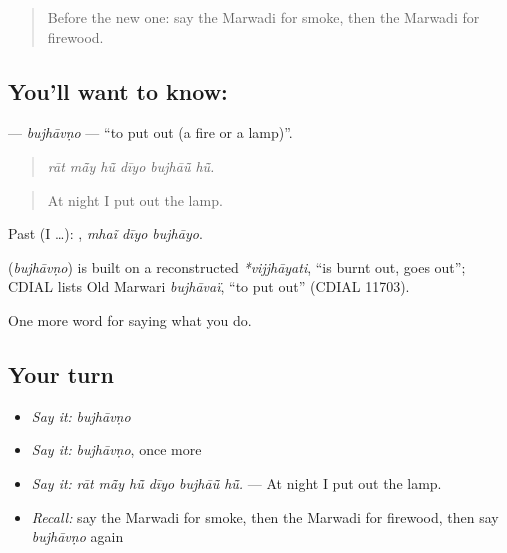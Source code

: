 \begin{quote}
Before the new one: say the Marwadi for smoke, then the Marwadi for firewood.
\end{quote}

\subsection*{You'll want to know: }
\textbf{} — \emph{bujhāvṇo} — \textquotedblleft{}to put out (a fire or a lamp)\textquotedblright{}.

\begin{quote}
     
\end{quote}

\begin{quote}
\emph{rāt mā̃y hū̃ dīyo bujhāū̃ hū̃.}
\end{quote}

\begin{quote}
At night I put out the lamp.
\end{quote}

Past (I …):   , \emph{mhaĩ dīyo bujhāyo}.

\begin{cousinweb}
\textbf{} (\emph{bujhāvṇo}) is built on a reconstructed \emph{*vijjhāyati}, \textquotedblleft{}is burnt out, goes out\textquotedblright{}; CDIAL lists Old Marwari \emph{bujhāvaï}, \textquotedblleft{}to put out\textquotedblright{} (CDIAL 11703).
\end{cousinweb}

\begin{grammarlens}[title={What you've built}]
One more word for saying what you do.
\end{grammarlens}

\subsection*{Your turn}
\begin{itemize}
\raggedright
  \item \emph{Say it:} \emph{bujhāvṇo}
  \item \emph{Say it:} \emph{bujhāvṇo}, once more
  \item \emph{Say it:} \emph{rāt mā̃y hū̃ dīyo bujhāū̃ hū̃.} — At night I put out the lamp.
  \item \emph{Recall:} say the Marwadi for smoke, then the Marwadi for firewood, then say \emph{bujhāvṇo} again
\end{itemize}

